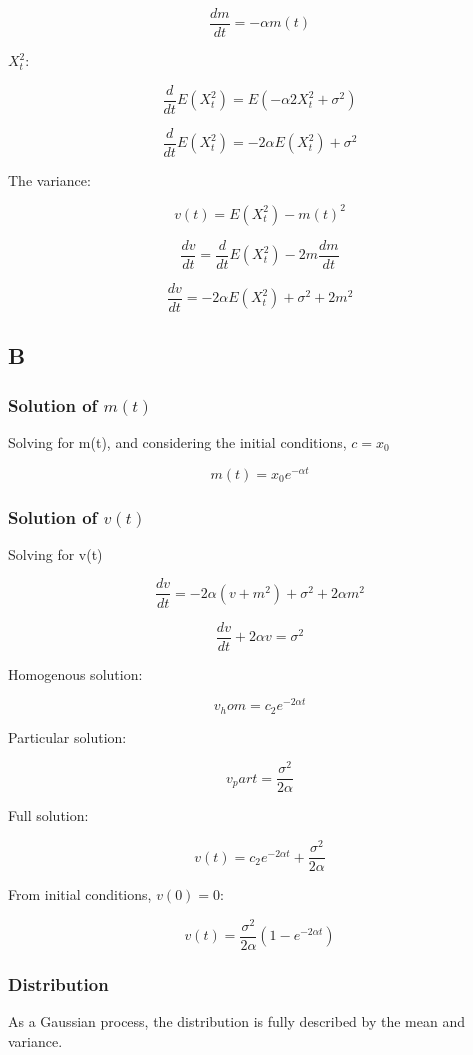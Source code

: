 \documentclass{article}
\begin{document}
$$\frac{dm}{dt} = -\alpha m(t)$$

$X_t^2$:

$$\frac{d}{dt}E(X_t^2) = E(- \alpha 2X_t^2 + \sigma^2)$$

$$\frac{d}{dt}E(X_t^2) = -2 \alpha E(X_t^2) + \sigma^2$$

The variance:

$$v(t) = E(X_t^2) -m(t)^2$$

$$\frac{dv}{dt} = \frac{d}{dt}E(X_t^2) - 2m\frac{dm}{dt}$$

$$\frac{dv}{dt} = -2 \alpha E(X_t^2) + \sigma^2 + 2m^2$$

\subsection{B}

\subsubsection{Solution of $m(t)$}

Solving for m(t), and considering the initial conditions, $c=x_0$

$$m(t) = x_0 e^{-\alpha t}$$

\subsubsection{Solution of $v(t)$}

Solving for v(t)

$$\frac{dv}{dt} = -2 \alpha (v + m^2) + \sigma^2 + 2 \alpha m^2$$

$$\frac{dv}{dt} +  2 \alpha v = \sigma^2$$

Homogenous solution:

$$v_hom = c_2 e^{-2 \alpha t}$$

Particular solution:

$$v_part = \frac{\sigma^2}{2 \alpha}$$

Full solution:

$$ v(t) = c_2 e^{-2 \alpha t} + \frac{\sigma^2}{2 \alpha}$$

From initial conditions, $v(0) = 0$:

$$ v(t) = \frac{\sigma^2}{2 \alpha}(1-e^{-2 \alpha t})$$

\subsubsection{Distribution}

As a Gaussian process, the distribution is fully described by the mean and variance.
\end{document}
